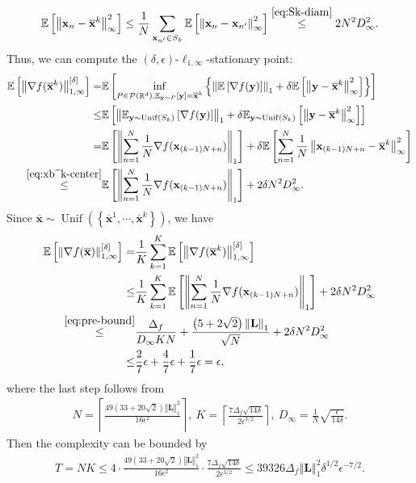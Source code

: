 \documentclass{article}
\def \y {\mathbf{y}}
\def \E {\mathbb{E}}
\def \x {\mathbf{x}}
\def \R {\mathbb{R}}
\def \P {\mathcal{P}}
\def \Lb {\mathbf{L}}
\def \xb {\overline{\x}}
\DeclareMathOperator*{\unif}{Unif}
\newcommand{\norm}[1]{\left\Vert#1\right\Vert}
\newcommand{\sqbrac}[1]{\left[#1\right]}
\newcommand{\brac}[1]{\left(#1\right)}
\newcommand{\cbrac}[1]{\left\{#1\right\}}
\def\ceil#1{\left\lceil #1 \right\rceil}
\begin{document}
\begin{equation}\label{eq:xb^k-center}
    \begin{aligned}
        \E\sqbrac{\norm{\x_n-\xb^k}_\infty^2}\le \frac{1}{N}\sum_{\x_{n^\prime}\in S_k}\E\sqbrac{\norm{\x_n-\x_{n^\prime}}_\infty^2}\overset{\eqref{eq:Sk-diam}}{\le}2N^2D_\infty^2.
    \end{aligned}
\end{equation}
Thus, we can compute the $(\delta,\epsilon)$-$\ell_{1,\infty}$-stationary point:
\begin{align*}
    \E\sqbrac{\norm{\nabla f(\xb^k)}_{1,\infty}^{[\delta]}}=&\E\sqbrac{\inf_{P\in\P(\R^d),\E_{\y\sim P}[\y]=\xb^k}\cbrac{\norm{\E\sqbrac{\nabla f(\y)}}_1+\delta\E\sqbrac{\norm{\y-\xb^k}_\infty^2}}}\\\le&\E\sqbrac{\norm{\E_{\y\sim\unif(S_k)}\sqbrac{\nabla f(\y)}}_1+\delta\E_{\y\sim\unif(S_k)}\sqbrac{\norm{\y-\xb^k}_\infty^2}}\\=&\E\sqbrac{\norm{\sum_{n=1}^N\frac{1}{N}\nabla f(\x_{(k-1)N+n})}_1}+\delta\E\sqbrac{\sum_{n=1}^N\frac{1}{N}\norm{\x_{(k-1)N+n}-\xb^k}_\infty^2}\\\overset{\eqref{eq:xb^k-center}}{\le}&\E\sqbrac{\norm{\sum_{n=1}^N\frac{1}{N}\nabla f(\x_{(k-1)N+n})}_1}+2\delta N^2D_\infty^2.
\end{align*}
Since $\xb\sim\unif\brac{\cbrac{\xb^1,\cdots,\xb^k}}$, we have
\begin{align*}
    \E\sqbrac{\norm{\nabla f(\xb)}_{1,\infty}^{[\delta]}}=&\frac{1}{K}\sum_{k=1}^K\E\sqbrac{\norm{\nabla f(\xb^k)}_{1,\infty}^{[\delta]}}\\\le&\frac{1}{K}\sum_{k=1}^K\E\sqbrac{\norm{\sum_{n=1}^N\frac{1}{N}\nabla f(\x_{(k-1)N+n})}_1}+2\delta N^2D_\infty^2\\\overset{\eqref{eq:pre-bound}}{\le}&\frac{\Delta_f}{D_\infty KN}+\frac{\brac{5+2\sqrt{2}}\norm{\Lb}_1}{\sqrt{N}}+2\delta N^2D_\infty^2\\\le& \frac{2}{7}\epsilon+\frac{4}{7}\epsilon+\frac{1}{7}\epsilon=\epsilon,
\end{align*}
where the last step follows from
\begin{align*}
    N=\ceil{\frac{49\brac{33+20\sqrt{2}}\norm{\Lb}_1^2}{16\epsilon^2}},\ K=\ceil{\frac{7\Delta_f\sqrt{14\delta}}{2\epsilon^{3/2}}},\ D_\infty=\frac{1}{N}\sqrt{\frac{\epsilon}{14\delta}}.
\end{align*}
Then the complexity can be bounded by
\begin{align*}
    T=NK\le4\cdot\frac{49\brac{33+20\sqrt{2}}\norm{\Lb}_1^2}{16\epsilon^2}\cdot\frac{7\Delta_f\sqrt{14\delta}}{2\epsilon^{3/2}}\le 39326\Delta_f\norm{\Lb}_1^2\delta^{1/2}\epsilon^{-7/2}.
\end{align*}
\end{document}
